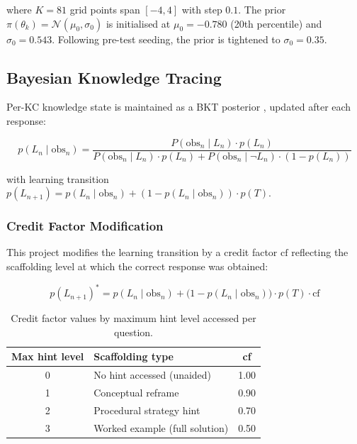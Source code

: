 where $K = 81$ grid points span $[-4, 4]$ with step $0.1$. The prior
$\pi(\theta_k) = \mathcal{N}(\mu_0, \sigma_0)$ is initialised at
$\mu_0 = -0.780$ (20th percentile) and $\sigma_0 = 0.543$. Following
pre-test seeding, the prior is tightened to $\sigma_0 = 0.35$.

\subsection{Bayesian Knowledge Tracing}
\label{subsec:meth_bkt}

Per-KC knowledge state is maintained as a BKT posterior \parencite{corbett1995},
updated after each response:

\begin{equation}
  p(L_n \mid \text{obs}_n) = \frac{P(\text{obs}_n \mid L_n) \cdot p(L_n)}
    {P(\text{obs}_n \mid L_n) \cdot p(L_n) + P(\text{obs}_n \mid \neg L_n)
    \cdot (1 - p(L_n))}
  \label{eq:bkt_update_meth}
\end{equation}

with learning transition $p(L_{n+1}) = p(L_n \mid \text{obs}_n) +
(1 - p(L_n \mid \text{obs}_n)) \cdot p(T)$.

\subsubsection*{Credit Factor Modification}

This project modifies the learning transition by a credit factor $\text{cf}$
reflecting the scaffolding level at which the correct response was obtained:

\begin{equation}
  p(L_{n+1})^* = p(L_n \mid \text{obs}_n) + \bigl(1 - p(L_n \mid
    \text{obs}_n)\bigr) \cdot p(T) \cdot \text{cf}
  \label{eq:bkt_credit_meth}
\end{equation}

\begin{table}[H]
\centering
\caption{Credit factor values by maximum hint level accessed per question.}
\label{tab:credit_factors}
\renewcommand{\arraystretch}{1.25}
\begin{tabular}{clc}
\toprule
\textbf{Max hint level} & \textbf{Scaffolding type} & \textbf{cf} \\
\midrule
0 & No hint accessed (unaided)         & 1.00 \\
1 & Conceptual reframe                 & 0.90 \\
2 & Procedural strategy hint           & 0.70 \\
3 & Worked example (full solution)     & 0.50 \\
\bottomrule
\end{tabular}
\end{table}

